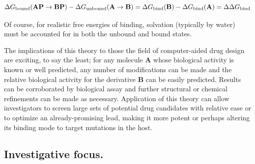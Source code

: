 \documentclass[12pt]{report}
\begin{document}
\vspace*{-0.8cm}
\begin{equation}
\label{ddgbind}
\Delta G_{\textrm{bound}}(\textrm{\textbf{AP}} \rightarrow \textrm{\textbf{BP}}) - \Delta G_{\textrm{unbound}}(\textrm{\textbf{A}} \rightarrow \textrm{\textbf{B}}) = \Delta G_{\textrm{bind}}(\textrm{\textbf{B}}) - \Delta G_{\textrm{bind}}(\textrm{\textbf{A}}) = \Delta\Delta G_{\textrm{bind}}
\end{equation}
\vspace*{-0.8cm}

Of course, for realistic free energies of binding, solvation (typically by water) must be accounted for in both the unbound and bound states.

The implications of this theory to those the field of computer-aided drug design are exciting, to say the least; for any molecule \textbf{A} whose biological activity is known or well predicted, any number of modifications can be made and the relative biological activity for the derivative \textbf{B} can be easily predicted. Results can be corroborated by biological assay and further structural or chemical refinements can be made as necessary. Application of this theory can allow investigators to screen large sets of potential drug candidates with relative ease or to optimize an already-promising lead, making it more potent or perhaps altering its binding mode to target mutations in the host.\cite{jorg2004sc}


\subsection{Investigative focus.}
\end{document}

